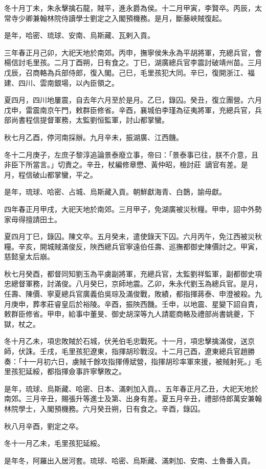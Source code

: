 \begin{pinyinscope}
冬十月丁未，朱永擊擒石龍，賊平，進永爵為侯。十二月甲寅，李賢卒。丙辰，太常寺少卿兼翰林院侍讀學士劉定之入閣預機務。是月，斷藤峽賊復起。

是年，哈密、琉球、安南、烏斯藏、瓦剌入貢。

三年春正月己卯，大祀天地於南郊。丙申，撫寧侯朱永為平胡將軍，充總兵官，會楊信討毛里孩。二月丁酉朔，日有食之。丁巳，湖廣總兵官李震討破靖州苗。三月戊辰，召商輅為兵部侍郎，復入閣。己巳，毛里孩犯大同。辛巳，復開浙江、福建、四川、雲南銀場，以內臣領之。

夏四月，四川地屢震，自去年六月至於是月。乙巳，錄囚。癸丑，復立團營。六月戊申，雷震南京午門，敕群臣修省。辛酉，襄城伯李瑾為征夷將軍，充總兵官，兵部尚書程信提督軍務，太監劉恒監軍，討山都掌蠻。

秋七月乙酉，停河南採辦。九月辛未，振湖廣、江西饑。

冬十二月庚子，左庶子黎淳追論景泰廢立事，帝曰：「景泰事已往，朕不介意，且非臣下所當言。」切責之。辛丑，杖編修章懋、黃仲昭，檢討莊，謫官有差。是月，程信破山都掌蠻，平之。

是年，琉球、哈密、占城、烏斯藏入貢。朝鮮獻海青、白鵲，諭毋獻。

四年春正月甲戌，大祀天地於南郊。三月甲子，免湖廣被災秋糧。甲申，詔中外勢家毋得擅請田土。

夏四月丁巳，錄囚。陳文卒。五月癸未，遣使錄天下囚。六月丙午，免江西被災秋糧。辛亥，開城賊滿俊反，陜西總兵官寧遠伯任壽、巡撫都御史陳價討之。甲寅，慈懿皇太后崩。

秋七月癸酉，都督同知劉玉為平虜副將軍，充總兵官，太監劉祥監軍，副都御史項忠總督軍務，討滿俊。八月癸巳，京師地震。乙卯，朱永代劉玉為總兵官。是月，任壽、陳價、寧夏總兵官廣義伯吳琮及滿俊戰，敗績，都指揮蔣泰、申澄被殺。九月庚申，葬孝莊睿皇后於裕陵。辛酉，振陜西饑。壬申，以地震、星變下詔自責，敕群臣修省。甲申，給事中董旻、御史胡深等九人請罷商輅及禮部尚書姚夔，下獄，杖之。

冬十月乙未，項忠敗賊於石城，伏羌伯毛忠戰死。十一月，項忠擊擒滿俊，送京師，伏誅。壬戌，毛里孩犯遼東，指揮胡珍戰沒。十二月己酉，遼東總兵官趙勝奏：「十一月初六日，虜賊千餘攻指揮傅斌營，指揮胡珍率軍來援，被賊射死。」毛里孩犯延綏，都指揮僉事許寧擊敗之。

是年，琉球、烏斯藏、哈密、日本、滿剌加入貢。、五年春正月乙丑，大祀天地於南郊。三月辛丑，賜張升等進士及第、出身有差。夏五月辛丑，禮部侍郎萬安兼翰林院學士，入閣預機務。六月癸丑朔，日有食之。辛酉，錄囚。

秋八月辛酉，劉定之卒。

冬十一月乙未，毛里孩犯延綏。

是年冬，阿羅出入居河套。琉球、哈密、烏斯藏、滿剌加、安南、土魯番入貢。


\end{pinyinscope}
